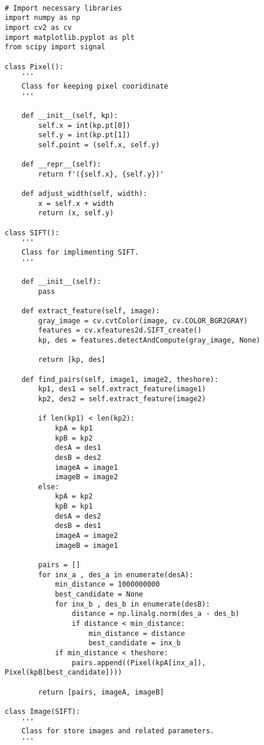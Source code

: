 \documentclass[11pt]{article}
\begin{document}
\begin{lstlisting}

# Import necessary libraries
import numpy as np
import cv2 as cv
import matplotlib.pyplot as plt
from scipy import signal

class Pixel():
    '''
    Class for keeping pixel cooridinate
    '''

    def __init__(self, kp):
        self.x = int(kp.pt[0])
        self.y = int(kp.pt[1])
        self.point = (self.x, self.y)

    def __repr__(self):
        return f'({self.x}, {self.y})'

    def adjust_width(self, width):
        x = self.x + width
        return (x, self.y)

class SIFT():
    '''
    Class for implimenting SIFT.
    '''
    
    def __init__(self):
        pass

    def extract_feature(self, image):
        gray_image = cv.cvtColor(image, cv.COLOR_BGR2GRAY)
        features = cv.xfeatures2d.SIFT_create()
        kp, des = features.detectAndCompute(gray_image, None)
        
        return [kp, des]

    def find_pairs(self, image1, image2, theshore):
        kp1, des1 = self.extract_feature(image1)
        kp2, des2 = self.extract_feature(image2)

        if len(kp1) < len(kp2):
            kpA = kp1
            kpB = kp2
            desA = des1
            desB = des2
            imageA = image1
            imageB = image2
        else:
            kpA = kp2
            kpB = kp1
            desA = des2
            desB = des1
            imageA = image2
            imageB = image1

        pairs = []
        for inx_a , des_a in enumerate(desA):
            min_distance = 1000000000
            best_candidate = None
            for inx_b , des_b in enumerate(desB):
                distance = np.linalg.norm(des_a - des_b)
                if distance < min_distance:
                    min_distance = distance
                    best_candidate = inx_b
            if min_distance < theshore:
                pairs.append((Pixel(kpA[inx_a]), Pixel(kpB[best_candidate])))
        
        return [pairs, imageA, imageB]

class Image(SIFT):
    ''' 
    Class for store images and related parameters.
    '''


\end{lstlisting}
\end{document}
